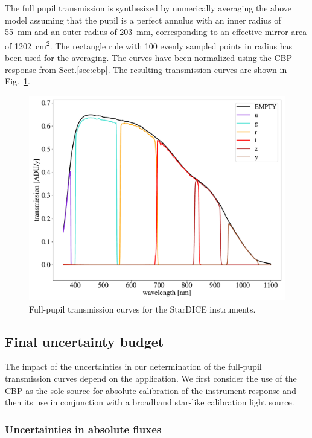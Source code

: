 The full pupil transmission is synthesized by numerically averaging
the above model assuming that the pupil is a perfect annulus with an
inner radius of \SI{55}{mm} and an outer radius of \SI{203}{mm},
corresponding to an effective mirror area of \SI{1202}{cm^2}. The
rectangle rule with 100 evenly sampled points in radius has been used
for the averaging. The curves have been normalized using the CBP
response from Sect.\ref{sec:cbp}. The resulting transmission curves
are shown in Fig.~\ref{fig:fullpupiltrans}.
\begin{figure}
  \centering
  \includegraphics[width=1\linewidth]{fig/fullpupill.pdf}
  \caption{Full-pupil transmission curves for the StarDICE instruments.}
  \label{fig:fullpupiltrans}
\end{figure}


\subsection{Final uncertainty budget}
\label{sec:final_uncertainty_budget}

The impact of the uncertainties in our determination of the full-pupil
transmission curves depend on the application. We first consider the
use of the CBP as the sole source for absolute calibration of the
instrument response and then its use in conjunction with a broadband
star-like calibration light source.

\subsubsection{Uncertainties in absolute fluxes}
\label{sec:absolute}


